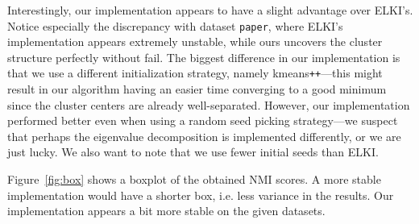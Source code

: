 \documentclass[english]{scrartcl}
\begin{document}
Interestingly, our implementation appears to have a slight advantage over
ELKI's.  Notice especially the discrepancy with dataset \texttt{paper}, where
ELKI's implementation appears extremely unstable, while ours uncovers the
cluster structure perfectly without fail. The biggest difference in our
implementation is that we use a different initialization strategy, namely
kmeans\texttt{++}---this might result in our algorithm having an easier time
converging to a good minimum since the cluster centers are already
well-separated. However, our implementation performed better even when using a
random seed picking strategy---we suspect that perhaps the eigenvalue
decomposition is implemented differently, or we are just lucky. We also want to
note that we use fewer initial seeds than ELKI.

Figure~\ref{fig:box} shows a boxplot of the obtained NMI scores. A more stable implementation
would have a shorter box, i.e. less variance in the results. Our implementation appears
a bit more stable on the given datasets.
\end{document}
